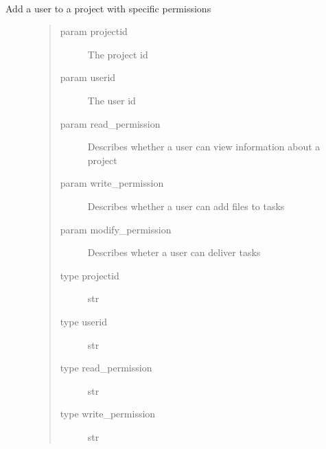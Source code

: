 \documentclass[letterpaper,10pt,english]{sphinxmanual}
\begin{document}
\begin{fulllineitems}
\label{\detokenize{index:models.project.set_projects_user}}~\begin{description}
\item[{Add a user to a project with specific permissions}] \leavevmode\begin{quote}\begin{description}
\item[{param projectid}] \leavevmode
The project id

\item[{param userid}] \leavevmode
The user id

\item[{param read\_permission}] \leavevmode
Describes whether a user can view information about a project

\item[{param write\_permission}] \leavevmode
Describes whether a user can add files to tasks

\item[{param modify\_permission}] \leavevmode
Describes wheter a user can deliver tasks

\item[{type projectid}] \leavevmode
str

\item[{type userid}] \leavevmode
str

\item[{type read\_permission}] \leavevmode
str

\item[{type write\_permission}] \leavevmode
str

\end{description}\end{quote}

\end{description}

\end{fulllineitems}

\end{document}
